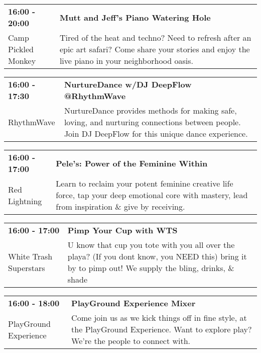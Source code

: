 \begin{tabular}{ p{1in} p{2.2in} }
    \textbf{16:00 - 20:00} & \textbf{Mutt and Jeff's Piano Watering Hole} \\
    Camp Pickled Monkey \newline  & Tired of the heat and techno? Need to refresh after an epic art safari? Come share your stories and enjoy the live piano in your neighborhood oasis. \\
    \hline 
\end{tabular}
    
\begin{tabular}{ p{1in} p{2.2in} }
    \textbf{16:00 - 17:30} & \textbf{NurtureDance w/DJ DeepFlow @RhythmWave} \\
    RhythmWave \newline  & NurtureDance provides methods for making safe, loving, and nurturing connections between people. Join DJ DeepFlow for this unique dance experience. \\
    \hline 
\end{tabular}
    
\begin{tabular}{ p{1in} p{2.2in} }
    \textbf{16:00 - 17:00} & \textbf{Pele's: Power of the Feminine Within} \\
    Red Lightning \newline  & Learn to reclaim your potent feminine creative life force, tap your deep emotional core with mastery, lead from inspiration \& give by receiving. \\
    \hline 
\end{tabular}
    
\begin{tabular}{ p{1in} p{2.2in} }
    \textbf{16:00 - 17:00} & \textbf{Pimp Your Cup with WTS} \\
    White Trash Superstars \newline  & U know that cup you tote with you all over the playa? (If you dont know, you NEED this) bring it by to pimp out! We supply the bling, drinks, \& shade \\
    \hline 
\end{tabular}
    
\begin{tabular}{ p{1in} p{2.2in} }
    \textbf{16:00 - 18:00} & \textbf{PlayGround Experience Mixer} \\
    PlayGround Experience \newline  & Come join us as we kick things off in fine style, at the PlayGround Experience. Want to explore play? We're the people to connect with. \\
    \hline 
\end{tabular}
    
